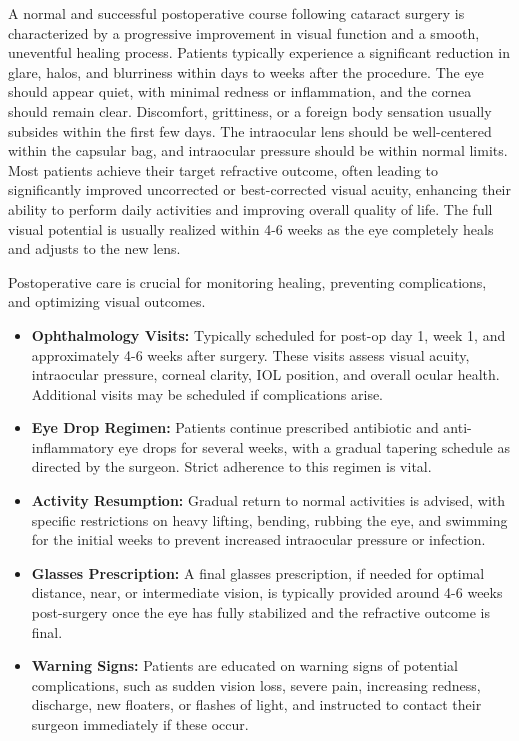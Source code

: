 A normal and successful postoperative course following cataract surgery is characterized by a progressive improvement in visual function and a smooth, uneventful healing process. Patients typically experience a significant reduction in glare, halos, and blurriness within days to weeks after the procedure. The eye should appear quiet, with minimal redness or inflammation, and the cornea should remain clear. Discomfort, grittiness, or a foreign body sensation usually subsides within the first few days. The intraocular lens should be well-centered within the capsular bag, and intraocular pressure should be within normal limits. Most patients achieve their target refractive outcome, often leading to significantly improved uncorrected or best-corrected visual acuity, enhancing their ability to perform daily activities and improving overall quality of life. The full visual potential is usually realized within 4-6 weeks as the eye completely heals and adjusts to the new lens.

Postoperative care is crucial for monitoring healing, preventing complications, and optimizing visual outcomes.

\begin{itemize}
  \item \textbf{Ophthalmology Visits:} Typically scheduled for post-op day 1, week 1, and approximately 4-6 weeks after surgery. These visits assess visual acuity, intraocular pressure, corneal clarity, IOL position, and overall ocular health. Additional visits may be scheduled if complications arise.
  \item \textbf{Eye Drop Regimen:} Patients continue prescribed antibiotic and anti-inflammatory eye drops for several weeks, with a gradual tapering schedule as directed by the surgeon. Strict adherence to this regimen is vital.
  \item \textbf{Activity Resumption:} Gradual return to normal activities is advised, with specific restrictions on heavy lifting, bending, rubbing the eye, and swimming for the initial weeks to prevent increased intraocular pressure or infection.
  \item \textbf{Glasses Prescription:} A final glasses prescription, if needed for optimal distance, near, or intermediate vision, is typically provided around 4-6 weeks post-surgery once the eye has fully stabilized and the refractive outcome is final.
  \item \textbf{Warning Signs:} Patients are educated on warning signs of potential complications, such as sudden vision loss, severe pain, increasing redness, discharge, new floaters, or flashes of light, and instructed to contact their surgeon immediately if these occur.
\end{itemize}

